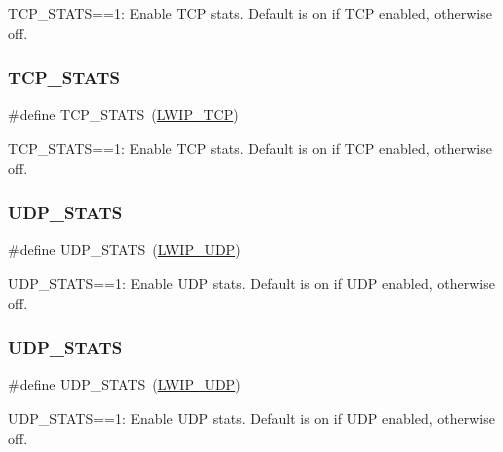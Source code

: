 T\+C\+P\+\_\+\+S\+T\+A\+TS==1\+: Enable T\+CP stats. Default is on if T\+CP enabled, otherwise off. \mbox{\label{group__lwip__opts__stats_gaa02ec5c5bc0edebe418680c54d044f58}} 
\subsubsection{\texorpdfstring{T\+C\+P\+\_\+\+S\+T\+A\+TS}{TCP\_STATS}\hspace{0.1cm}{\footnotesize\ttfamily [2/2]}}
{\footnotesize\ttfamily \#define T\+C\+P\+\_\+\+S\+T\+A\+TS~(\hyperlink{group__lwip__opts__tcp_gaa4ed98deb97b77c633cb8870f34c71e9}{L\+W\+I\+P\+\_\+\+T\+CP})}

T\+C\+P\+\_\+\+S\+T\+A\+TS==1\+: Enable T\+CP stats. Default is on if T\+CP enabled, otherwise off. \mbox{\label{group__lwip__opts__stats_gaef64b11bf71f0d6d5bafaf6092462276}} 
\subsubsection{\texorpdfstring{U\+D\+P\+\_\+\+S\+T\+A\+TS}{UDP\_STATS}\hspace{0.1cm}{\footnotesize\ttfamily [1/2]}}
{\footnotesize\ttfamily \#define U\+D\+P\+\_\+\+S\+T\+A\+TS~(\hyperlink{group__lwip__opts__udp_gab6030e96e72df649d2650fd32d7a67b3}{L\+W\+I\+P\+\_\+\+U\+DP})}

U\+D\+P\+\_\+\+S\+T\+A\+TS==1\+: Enable U\+DP stats. Default is on if U\+DP enabled, otherwise off. \mbox{\label{group__lwip__opts__stats_gaef64b11bf71f0d6d5bafaf6092462276}} 
\subsubsection{\texorpdfstring{U\+D\+P\+\_\+\+S\+T\+A\+TS}{UDP\_STATS}\hspace{0.1cm}{\footnotesize\ttfamily [2/2]}}
{\footnotesize\ttfamily \#define U\+D\+P\+\_\+\+S\+T\+A\+TS~(\hyperlink{group__lwip__opts__udp_gab6030e96e72df649d2650fd32d7a67b3}{L\+W\+I\+P\+\_\+\+U\+DP})}

U\+D\+P\+\_\+\+S\+T\+A\+TS==1\+: Enable U\+DP stats. Default is on if U\+DP enabled, otherwise off. 